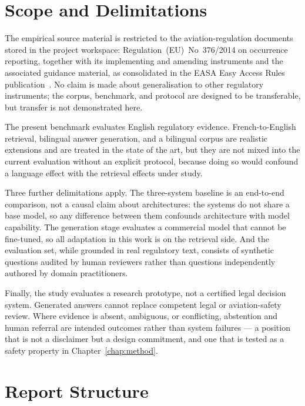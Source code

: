 \section{Scope and Delimitations}
\label{sec:intro-scope}

The empirical source material is restricted to the aviation-regulation documents stored in the project workspace: Regulation~(EU)~No~376/2014 on occurrence reporting, together with its implementing and amending instruments and the associated guidance material, as consolidated in the \ac{EASA} Easy Access Rules publication~\cite{eu2014reg376,easa2022easyaccess376}. No claim is made about generalisation to other regulatory instruments; the corpus, benchmark, and protocol are designed to be transferable, but transfer is not demonstrated here.

The present benchmark evaluates English regulatory evidence. French-to-English retrieval, bilingual answer generation, and a bilingual corpus are realistic extensions and are treated in the state of the art, but they are not mixed into the current evaluation without an explicit protocol, because doing so would confound a language effect with the retrieval effects under study.

Three further delimitations apply. The three-system baseline is an end-to-end comparison, not a causal claim about architectures: the systems do not share a base model, so any difference between them confounds architecture with model capability. The generation stage evaluates a commercial model that cannot be fine-tuned, so all adaptation in this work is on the retrieval side. And the evaluation set, while grounded in real regulatory text, consists of synthetic questions audited by human reviewers rather than questions independently authored by domain practitioners.

Finally, the study evaluates a research prototype, not a certified legal decision system. Generated answers cannot replace competent legal or aviation-safety review. Where evidence is absent, ambiguous, or conflicting, abstention and human referral are intended outcomes rather than system failures --- a position that is not a disclaimer but a design commitment, and one that is tested as a safety property in Chapter~\ref{chap:method}.

\section{Report Structure}
\label{sec:intro-structure}

